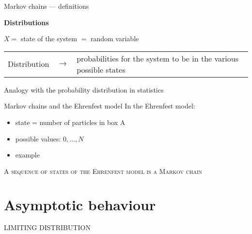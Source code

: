 \documentclass[usenames,dvipsnames]{beamer}
\begin{document}
  \begin{frame}{Markov chains --- definitions}
    \begin{center}
      \Large \textbf{Distributions}
    \end{center}
    \begin{center}
      $X = $ state of the system $=$ random variable
    \end{center}

    \renewcommand{\tabularxcolumn}{m}
    \begin{table}
      \begin{tabularx}{0.9\textwidth}{c c >{\raggedright}X}
        Distribution & $\rightarrow$ & probabilities for the system to be in the various possible states
      \end{tabularx}

      \bigskip
      Analogy with the probability distribution in statistics
    \end{table}
    
  \end{frame}

  \begin{frame}{Markov chains and the Ehrenfest model}
    \Large In the Ehrenfest model:
    \normalsize
    \begin{itemize}
      \item state = number of particles in box A
      \item possible values: $0, \dots, N$
      \item example
    \end{itemize}

    \begin{figure}[r]
      
    \end{figure}
  \end{frame}

  \begin{frame}[standout]
    \textsc{A sequence of states of the Ehrenfest model is a Markov chain}
  \end{frame}


  \section{Asymptotic behaviour}
  \begin{frame}{LIMITING DISTRIBUTION}
    
  \end{frame}
\end{document}
